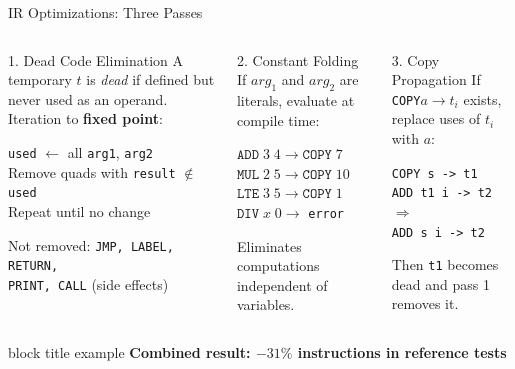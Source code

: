 \documentclass[aspectratio=169,11pt]{beamer}
\begin{document}
\begin{frame}[fragile]{IR Optimizations: Three Passes}
\begin{columns}[t]
  \begin{block}{1. Dead Code Elimination}
    \small A temporary $t$ is \emph{dead} if defined but never used as an operand.
    Iteration to \textbf{fixed point}:

    \medskip
    \texttt{used} $\leftarrow$ all \texttt{arg1}, \texttt{arg2}\\
    Remove quads with \texttt{result} $\notin$ \texttt{used}\\
    Repeat until no change

    \medskip
    Not removed: \texttt{JMP, LABEL, RETURN,\\PRINT, CALL} (side effects)
  \end{block}

  \begin{block}{2. Constant Folding}
    \small If $arg_1$ and $arg_2$ are literals, evaluate at compile time:

    \medskip
    $\texttt{ADD}\;3\;4 \to \texttt{COPY}\;7$\\
    $\texttt{MUL}\;2\;5 \to \texttt{COPY}\;10$\\
    $\texttt{LTE}\;3\;5 \to \texttt{COPY}\;1$\\
    $\texttt{DIV}\;x\;0 \to$ \texttt{error}

    \medskip
    Eliminates computations independent of variables.
  \end{block}

  \begin{block}{3. Copy Propagation}
    \small If \texttt{COPY}\;$a$\;$\to$\;$t_i$ exists, replace uses of $t_i$ with $a$:

    \medskip
    \texttt{COPY   s -> t1}\\
    \texttt{ADD    t1 i -> t2} $\Longrightarrow$\\
    \texttt{ADD    s  i -> t2}

    \medskip
    Then \texttt{t1} becomes dead and pass 1 removes it.
  \end{block}
\end{columns}

\vspace{0.3cm}
\begin{beamercolorbox}[rounded=true,center,wd=0.85\textwidth]{block title example}
  \centering\small\bfseries
  Combined result: $-31\%$ instructions in reference tests
\end{beamercolorbox}
\end{frame}
\end{document}
